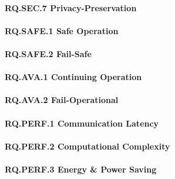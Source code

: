 \paragraph{RQ.SEC.7 Privacy-Preservation}

\paragraph{RQ.SAFE.1 Safe Operation}
\paragraph{RQ.SAFE.2 Fail-Safe}

\paragraph{RQ.AVA.1 Continuing Operation}
\paragraph{RQ.AVA.2 Fail-Operational}

\paragraph{RQ.PERF.1 Communication Latency}
\paragraph{RQ.PERF.2 Computational Complexity}
\paragraph{RQ.PERF.3 Energy \& Power Saving}

